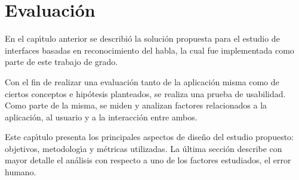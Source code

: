 \chapter{Evaluaci\'on}
\label{sec:evaluacion}


En el cap{\'\i}tulo anterior se describi\'o la soluci\'on propuesta para el estudio de interfaces basadas en
reconocimiento del habla, la cual fue implementada como parte de este trabajo de grado.

Con el fin de realizar una evaluaci\'on tanto de la aplicaci\'on misma como de ciertos conceptos 
e hip\'otesis planteados, se realiza una prueba de usabilidad. 
Como parte de la misma, se miden y analizan factores relacionados a la aplicaci\'on,
al usuario y a la interacci\'on entre ambos.

Este cap{\'\i}tulo presenta los principales aspectos de dise\~no del estudio propuesto: objetivos, metodolog{\'\i}a
y m\'etricas utilizadas. La \'ultima secci\'on describe con mayor detalle el an\'alisis con respecto
a uno de los factores estudiados, el error humano.






